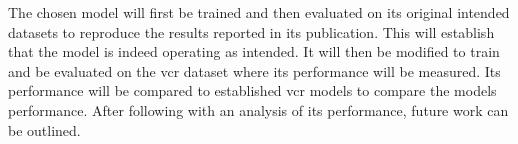 The chosen model will first be trained and then evaluated on its original intended datasets to reproduce the results reported in its publication.
This will establish that the model is indeed operating as intended.
It will then be modified to train and be evaluated on the \gls{vcr} dataset where its performance will be measured.
Its performance will be compared to established \gls{vcr} models to compare the models performance.
After following with an analysis of its performance, future work can be outlined.
